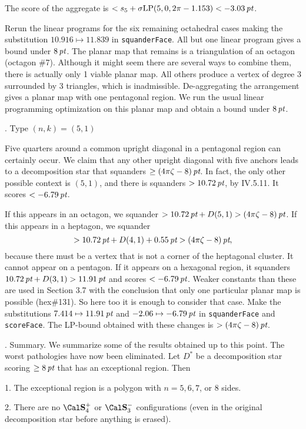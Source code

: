 The score of the aggregate is $<s_5+\operatorname{\hbox{$\sigma$}LP}(5,0,2\pi-1.153)<-3.03\,\hbox{\it pt}$.

Rerun the linear programs for the six remaining octahedral cases making
the substitution $10.916\mapsto11.839$ in {\tt squanderFace}. 
All but one linear program gives a bound under $8\,\hbox{\it pt}$.  The planar
map that remains is a triangulation of an octagon (octagon \#7).  
Although it might
seem there are several ways to combine them, there is actually only
1 viable planar map.  All others produce a vertex of degree 3 surrounded
by 3 triangles, which is inadmissible.   De-aggregating the arrangement
gives a planar map with one pentagonal region.  We run the usual
linear programming optimization on this planar map and obtain
a bound under $8\,\hbox{\it pt}$.

. Type $(n,k)=(5,1)$\endsubhead

Five quarters around a common upright diagonal in a pentagonal
region can certainly occur.  We claim that any other upright
diagonal with five anchors leads to a decomposition star that
squanders $\ge(4\pi\zeta-8)\,\hbox{\it pt}$.  In fact, the only other possible
context is $(5,1)$, and there is squanders $>10.72\,\hbox{\it pt}$, by IV.5.11.
It scores $<-6.79\,\hbox{\it pt}$.

If this appears in an octagon, we squander $>10.72\,\hbox{\it pt}+D(5,1)>(4\pi\zeta-8)\,\hbox{\it pt}$.
If this appears in a heptagon, we squander
$$>10.72\,\hbox{\it pt} + D(4,1) + 0.55\,\hbox{\it pt} > (4\pi\zeta-8)\,\hbox{\it pt},$$
because there must be a vertex that is not a corner of the heptagonal
cluster.
It cannot appear on a pentagon.  If it appears on a hexagonal region,
it squanders $10.72\,\hbox{\it pt}+D(3,1)>11.91\,\hbox{\it pt}$ and scores $<-6.79\,\hbox{\it pt}$.
Weaker constants than these are used in Section 3.7 with the
conclusion that only one particular planar map is possible (hex\#131).
So here too it is enough to consider that case.  Make the
substitutions $7.414\mapsto 11.91\,\hbox{\it pt}$ and $-2.06\mapsto -6.79\,\hbox{\it pt}$
in {\tt squanderFace} and {\tt scoreFace}.  The LP-bound obtained
with these changes is $>(4\pi\zeta-8)\,\hbox{\it pt}$.

.  Summary.\endsubhead
We summarize some of the results obtained up to this point.
The worst pathologies have now been eliminated.
Let $D^*$ be a decomposition star scoring $\ge8\,\hbox{\it pt}$ that
has an exceptional region.  Then

1.  The exceptional region is a polygon with $n=5,6,7$, or $8$ sides.

2.  There are no $\Sfour$ or $\Sminus$ configurations (even in
	the original decomposition star before anything is erased).


